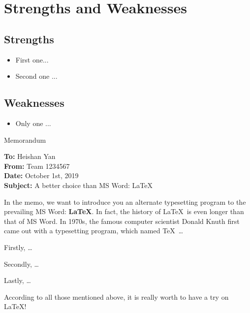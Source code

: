 \documentclass[12pt]{article}  %
\begin{document}
\section{Strengths and Weaknesses}
\subsection{Strengths}
\begin{itemize}
    \item First one...
    \item Second one ...
\end{itemize}

\subsection{Weaknesses}
\begin{itemize}
    \item Only one ...
 \end{itemize}










\begin{letter}{Memorandum}
\begin{flushleft}  %
\textbf{To:} Heishan Yan\\
\textbf{From:} Team 1234567\\
\textbf{Date:} October 1st, 2019\\
\textbf{Subject:} A better choice than MS Word: \LaTeX
\end{flushleft}

In the memo, we want to introduce you an alternate typesetting program to the prevailing MS Word: \textbf{\LaTeX}. In fact, the history of \LaTeX\ is even longer than that of MS Word. In 1970s, the famous computer scientist Donald Knuth first came out with a typesetting program, which named \TeX\ \ldots

Firstly, \ldots

Secondly, \ldots

Lastly, \ldots

According to all those mentioned above, it is really worth to have a try on \LaTeX! 
\end{letter}
\end{document}
